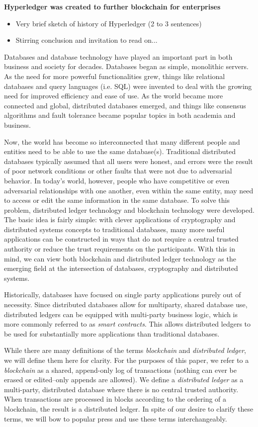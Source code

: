 \textbf{Hyperledger was created to further blockchain for enterprises}
\begin{itemize}
\item Very brief sketch of history of Hyperledger (2 to 3 sentences)
\item Stirring conclusion and invitation to read on...
\end{itemize}
\newpage

Databases and database technology have played an important part in both business and society for decades. Databases began as simple, monolithic servers. As the need for more powerful functionalities grew, things like relational databases and query languages (i.e. SQL) were invented to deal with the growing need for improved efficiency and ease of use. As the world became more connected and global, distributed databases emerged, and things like consensus algorithms and fault tolerance became popular topics in both academia and business.

Now, the world has become so interconnected that many different people and entities need to be able to use the same database(s). Traditional distributed databases typically assumed that all users were honest, and errors were the result of poor network conditions or other faults that were not due to adversarial behavior. In today's world, however, people who have competitive or even adversarial relationships with one another, even within the same entity, may need to access or edit the same information in the same database. To solve this problem, distributed ledger technology and blockchain technology were developed. The basic idea is fairly simple: with clever applications of cryptography and distributed systems concepts to traditional databases, many more useful applications can be constructed in ways that do not require a central trusted authority or reduce the trust requirements on the participants. With this in mind, we can view both blockchain and distributed ledger technology as the emerging field at the intersection of databases, cryptography and distributed systems.

Historically, databases have focused on single party applications purely out of necessity.  Since distributed databases allow for multiparty, shared database use, distributed ledgers can be equipped with multi-party business logic, which is more commonly referred to as \emph{smart contracts}.  This allows distributed ledgers to be used for substantially more applications than traditional databases.

While there are many definitions of the terms \emph{blockchain} and \emph{distributed ledger}, we will define them here for clarity. For the purposes of this paper, we refer to a \emph{blockchain} as a shared, append-only log of transactions (nothing can ever be erased or edited--only appends are allowed). We define a \emph{distributed ledger} as a multi-party, distributed database where there is no central trusted authority. When transactions are processed in blocks according to the ordering of a blockchain, the result is a distributed ledger.  In spite of our desire to clarify these terms, we will bow to popular press and use these terms interchangeably. 

